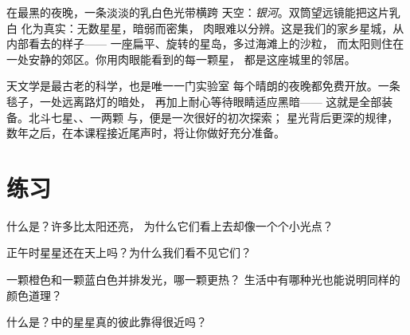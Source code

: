 \begin{example}[星星之城]\label{ex:g5:stars-night-sky:milkyway}
在最黑的夜晚，一条淡淡的乳白色光带横跨
天空：\emph{银河}。双筒望远镜能把这片乳白
化为真实：无数星星，暗弱而密集，
肉眼难以分辨。这是我们的家乡星城，从内部看去的样子——
一座扁平、旋转的星岛，多过海滩上的沙粒，
而太阳则住在一处安静的郊区。你用肉眼能看到的每一颗星，
都是这座城里的邻居。
\end{example}

\begin{remark}[继续仰望]\label{rem:g5:stars-night-sky:lookup}
天文学是最古老的科学，也是唯一一门实验室
每个晴朗的夜晚都免费开放。一条毯子，一处远离路灯的暗处，
再加上耐心等待眼睛适应黑暗——
这就是全部装备。北斗七星、、一两颗
与，便是一次很好的初次探索；
星光背后更深的规律，
数年之后，在本课程接近尾声时，将让你做好充分准备。
\end{remark}

\section{练习}

\begin{exercise}[$\star$]\label{exo:g5:stars-night-sky:1}
什么是？许多比太阳还亮，
为什么它们看上去却像一个个小光点？
\end{exercise}

\begin{exercise}[$\star$]\label{exo:g5:stars-night-sky:2}
正午时星星还在天上吗？为什么我们看不见它们？
\end{exercise}

\begin{exercise}[$\star$]\label{exo:g5:stars-night-sky:3}
一颗橙色和一颗蓝白色并排发光，哪一颗更热？
生活中有哪种光也能说明同样的颜色道理？
\end{exercise}

\begin{exercise}[$\star$]\label{exo:g5:stars-night-sky:4}
什么是？中的星星真的彼此靠得很近吗？
\end{exercise}

